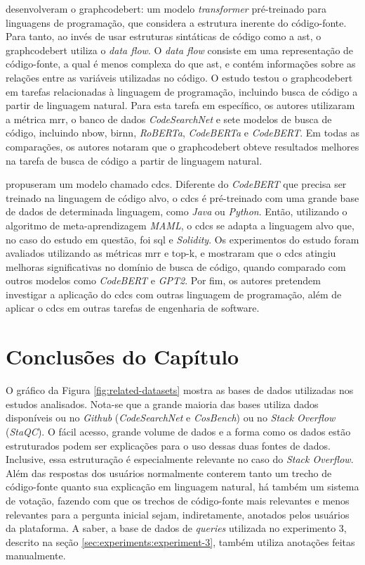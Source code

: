 \textcite{Guo2021GraphCodeBERTPC} desenvolveram o \gls{graphcodebert}: um modelo \textit{transformer} pré-treinado para linguagens de programação, que considera a estrutura inerente do código-fonte. Para tanto, ao invés de usar estruturas sintáticas de código como a \gls{ast}, o \gls{graphcodebert} utiliza o \textit{data flow}. O \textit{data flow} consiste em uma representação de código-fonte, a qual é menos complexa do que \gls{ast}, e contém informações sobre as relações entre as variáveis utilizadas no código. O estudo testou o \gls{graphcodebert} em tarefas relacionadas à linguagem de programação, incluindo busca de código a partir de linguagem natural. Para esta tarefa em específico, os autores utilizaram a métrica \gls{mrr}, o banco de dados \textit{CodeSearchNet} \cite{Husain2019CodeSearchNetCE} e sete modelos de busca de código, incluindo \gls{nbow}, \gls{birnn}, \textit{RoBERTa}, \textit{CodeBERTa} e \textit{CodeBERT}. Em todas as comparações, os autores notaram que o \gls{graphcodebert} obteve resultados melhores na tarefa de busca de código a partir de linguagem natural.

\textcite{Chai2022CrossDomainDC} propuseram um modelo chamado \gls{cdcs}. Diferente do \textit{CodeBERT} que precisa ser treinado na linguagem de código alvo, o \gls{cdcs} é pré-treinado com uma grande base de dados de determinada linguagem, como \textit{Java} ou \textit{Python}. Então, utilizando o algoritmo de meta-aprendizagem \textit{MAML}, o \gls{cdcs} se adapta a linguagem alvo que, no caso do estudo em questão, foi \gls{sql} e \textit{Solidity}. Os experimentos do estudo foram avaliados utilizando as métricas \gls{mrr} e top-k, e mostraram que o \gls{cdcs} atingiu melhoras significativas no domínio de busca de código, quando comparado com outros modelos como \textit{CodeBERT} e \textit{GPT2}. Por fim, os autores pretendem investigar a aplicação do \gls{cdcs} com outras linguagem de programação, além de aplicar o \gls{cdcs} em outras tarefas de engenharia de software.

\section{Conclusões do Capítulo}
O gráfico da Figura \ref{fig:related-datasets} mostra as bases de dados utilizadas nos estudos analisados. Nota-se que a grande maioria das bases utiliza dados disponíveis ou no \textit{Github} (\textit{CodeSearchNet} e \textit{CosBench}) ou no \textit{Stack Overflow} (\textit{StaQC}). O fácil acesso, grande volume de dados e a forma como os dados estão estruturados podem ser explicações para o uso dessas duas fontes de dados. Inclusive, essa estruturação é especialmente relevante no caso do \textit{Stack Overflow}. Além das respostas dos usuários normalmente conterem tanto um trecho de código-fonte quanto sua explicação em linguagem natural, há também um sistema de votação, fazendo com que os trechos de código-fonte mais relevantes e menos relevantes para a pergunta inicial sejam, indiretamente, anotados pelos usuários da plataforma. A saber, a base de dados de \textit{queries} utilizada no experimento 3, descrito na seção \ref{sec:experiments:experiment-3}, também utiliza anotações feitas manualmente.


